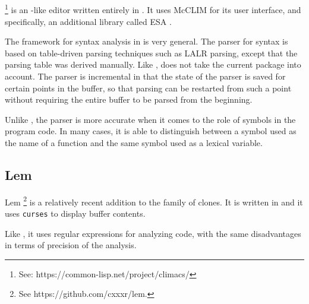 \subsection{\climacs{}}

\climacs%
\footnote{See: https://common-lisp.net/project/climacs/}
is an \emacs{}-like editor written entirely in \commonlisp{}.  It uses
McCLIM \cite{Strandh:2002:ILC:McCLIM}
for its user interface, and specifically, an additional library called
ESA \cite{Strandh:2007:ECL:1622123.1622150}.

The framework for syntax analysis in \climacs{}
\cite{Rhodes.etal:2005} is very general.  The parser for \commonlisp{}
syntax is based on table-driven parsing techniques such as LALR
parsing, except that the parsing table was derived manually.  Like
\emacs{}, \climacs{} does not take the current package into account.
The parser is incremental in that the state of the parser is saved for
certain points in the buffer, so that parsing can be restarted from
such a point without requiring the entire buffer to be parsed from the
beginning.

Unlike \emacs{}, the \climacs{} parser is more accurate when it comes
to the role of symbols in the program code.  In many cases, it is able
to distinguish between a symbol used as the name of a function and the
same symbol used as a lexical variable.

\subsection{Lem}

Lem%
\footnote{See https://github.com/cxxxr/lem.}
is a relatively recent addition to the family of \emacs{} clones.  It
is written in \commonlisp{} and it uses \texttt{curses} to display
buffer contents.

Like \emacs{} , it uses regular expressions
for analyzing \commonlisp{} code, with the same disadvantages in terms
of precision of the analysis.

